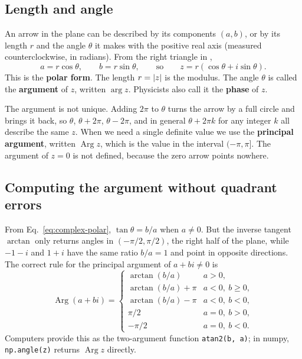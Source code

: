\subsection{Length and angle}

An arrow in the plane can be described by its components $(a,b)$, or by its length $r$ and the angle $\theta$ it makes with the positive real axis (measured counterclockwise, in radians). From the right triangle in ,
\begin{equation}
a=r\cos\theta,\qquad b=r\sin\theta,\qquad\text{so}\qquad z=r(\cos\theta+i\sin\theta).\label{eq:complex-polar}
\end{equation}
This is the \textbf{polar form}. The length $r=\left\lvert z\right\rvert$ is the modulus. The angle $\theta$ is called the \textbf{argument} of $z$, written $\arg z$. Physicists also call it the \textbf{phase} of $z$.

The argument is not unique. Adding $2\pi$ to $\theta$ turns the arrow by a full circle and brings it back, so $\theta$, $\theta+2\pi$, $\theta-2\pi$, and in general $\theta+2\pi k$ for any integer $k$ all describe the same $z$. When we need a single definite value we use the \textbf{principal argument}, written $\operatorname{Arg} z$, which is the value in the interval $(-\pi,\pi]$. The argument of $z=0$ is not defined, because the zero arrow points nowhere.

\subsection{Computing the argument without quadrant errors}

From Eq.~\eqref{eq:complex-polar}, $\tan\theta=b/a$ when $a\ne0$. But the inverse tangent $\arctan$ only returns angles in $(-\pi/2,\pi/2)$, the right half of the plane, while $-1-i$ and $1+i$ have the same ratio $b/a=1$ and point in opposite directions. The correct rule for the principal argument of $a+bi\neq0$ is
\begin{equation}
\operatorname{Arg}(a+bi)=
\begin{cases}
\arctan(b/a) & a>0,\\
\arctan(b/a)+\pi & a<0,\ b\ge0,\\
\arctan(b/a)-\pi & a<0,\ b<0,\\
\pi/2 & a=0,\ b>0,\\
-\pi/2 & a=0,\ b<0.
\end{cases}\label{eq:complex-atan2}
\end{equation}
Computers provide this as the two-argument function \texttt{atan2(b, a)}; in numpy, \texttt{np.angle(z)} returns $\operatorname{Arg}z$ directly.

